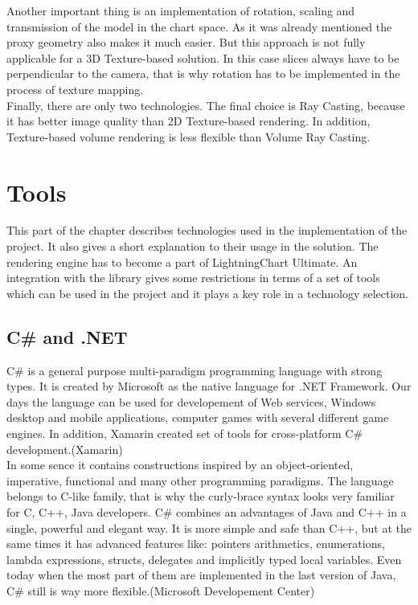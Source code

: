 \documentclass[twoside, english, 11pt]{report}
\begin{document}
Another important thing is an implementation of rotation, scaling and transmission of the model in the chart space. As it was already mentioned the proxy geometry also makes it much easier. But this approach is not fully applicable for a 3D Texture-based solution. In this case slices always have to be perpendicular to the camera, that is why rotation has to be implemented in the process of texture mapping.\\

Finally, there are only two technologies. The final choice is Ray Casting, because it has better image quality than 2D Texture-based rendering. In addition, Texture-based volume rendering is less flexible than Volume Ray Casting.
\section{Tools}
This part of the chapter describes technologies used in the implementation of the project. It also gives a short explanation to their usage in the solution. The rendering engine has to become a part of LightningChart Ultimate. An integration with the library gives some restrictions in terms of a set of tools which can be used in the project and it plays a key role in a technology selection.
\subsection{C\# and .NET}
C\# is a general purpose multi-paradigm programming language with strong types. It is created by Microsoft as the native language for .NET Framework. Our days the language can be used for developement of Web services, Windows desktop and mobile applications, computer games with several different game engines. In addition, Xamarin created set of tools for cross-platform C\# development.(Xamarin)\\

In some sence it contains constructions inspired by an object-oriented, imperative, functional and many other programming paradigms. The language belongs to C-like family, that is why the curly-brace syntax looks very familiar for C, C++, Java developers. C\# combines an advantages of Java and C++ in a single, powerful and elegant way. It is more simple and safe than C++, but at the same times it has advanced features like: pointers arithmetics, enumerations, lambda expressions, structs, delegates and implicitly typed local variables. Even today when the most part of them are implemented in the last version of Java, C\# still is way more flexible.(Microsoft Developement Center)\\
\end{document}
